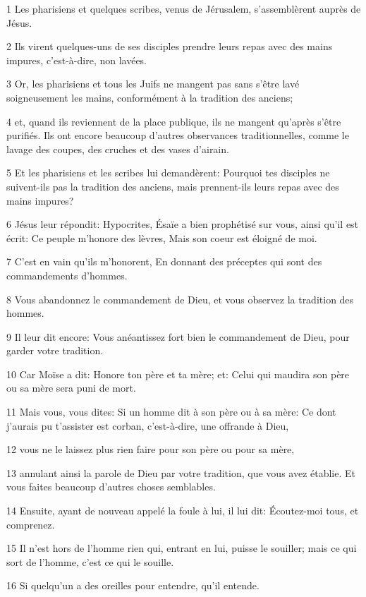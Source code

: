 \par 1 Les pharisiens et quelques scribes, venus de Jérusalem, s'assemblèrent auprès de Jésus.
\par 2 Ils virent quelques-uns de ses disciples prendre leurs repas avec des mains impures, c'est-à-dire, non lavées.
\par 3 Or, les pharisiens et tous les Juifs ne mangent pas sans s'être lavé soigneusement les mains, conformément à la tradition des anciens;
\par 4 et, quand ils reviennent de la place publique, ils ne mangent qu'après s'être purifiés. Ils ont encore beaucoup d'autres observances traditionnelles, comme le lavage des coupes, des cruches et des vases d'airain.
\par 5 Et les pharisiens et les scribes lui demandèrent: Pourquoi tes disciples ne suivent-ils pas la tradition des anciens, mais prennent-ils leurs repas avec des mains impures?
\par 6 Jésus leur répondit: Hypocrites, Ésaïe a bien prophétisé sur vous, ainsi qu'il est écrit: Ce peuple m'honore des lèvres, Mais son coeur est éloigné de moi.
\par 7 C'est en vain qu'ils m'honorent, En donnant des préceptes qui sont des commandements d'hommes.
\par 8 Vous abandonnez le commandement de Dieu, et vous observez la tradition des hommes.
\par 9 Il leur dit encore: Vous anéantissez fort bien le commandement de Dieu, pour garder votre tradition.
\par 10 Car Moïse a dit: Honore ton père et ta mère; et: Celui qui maudira son père ou sa mère sera puni de mort.
\par 11 Mais vous, vous dites: Si un homme dit à son père ou à sa mère: Ce dont j'aurais pu t'assister est corban, c'est-à-dire, une offrande à Dieu,
\par 12 vous ne le laissez plus rien faire pour son père ou pour sa mère,
\par 13 annulant ainsi la parole de Dieu par votre tradition, que vous avez établie. Et vous faites beaucoup d'autres choses semblables.
\par 14 Ensuite, ayant de nouveau appelé la foule à lui, il lui dit: Écoutez-moi tous, et comprenez.
\par 15 Il n'est hors de l'homme rien qui, entrant en lui, puisse le souiller; mais ce qui sort de l'homme, c'est ce qui le souille.
\par 16 Si quelqu'un a des oreilles pour entendre, qu'il entende.
